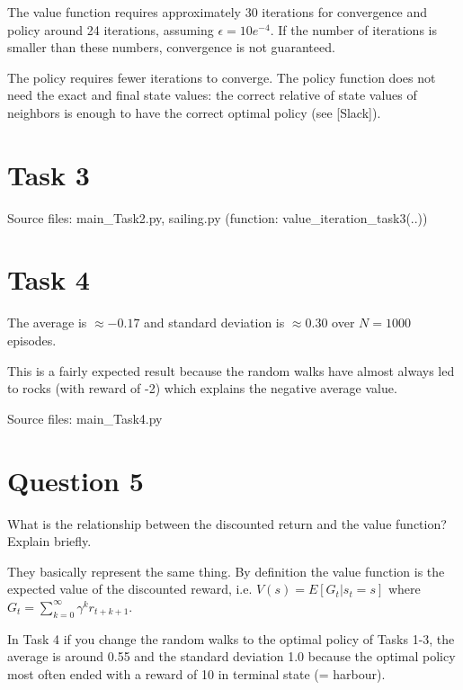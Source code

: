 \documentclass[12pt]{article}
\begin{document}
The value function requires approximately 30 iterations for convergence and policy around 24 iterations, assuming $\epsilon = 10e^{-4}$. If the number of iterations is smaller than these numbers, convergence is not guaranteed.
\newline

The policy requires fewer iterations to converge. The policy function does not need the exact and final state values: the correct relative of state values of neighbors is enough to have the correct optimal policy (see [Slack]).

\section*{Task 3}

\noindent
Source files: main\_Task2.py, sailing.py (function: value\_iteration\_task3(..))

\section*{Task 4}

The average is $\approx -0.17$ and standard deviation is $\approx 0.30$ over $N = 1000$ episodes. 
\newline

This is a fairly expected result because the random walks have almost always led to rocks (with reward of -2) which explains the negative average value.
\newline

\noindent
Source files: main\_Task4.py

\section*{Question 5}

What is the relationship between the discounted return and the value function?  
Explain briefly.
\newline

They basically represent the same thing. By definition the value function is the expected value of the discounted reward, i.e. $V(s) = E[G_t|s_t=s]$ where $G_t=\sum_{k=0}^{\infty} \gamma^k r_{t+k+1}$.
\newline

In Task 4 if you change the random walks to the optimal policy of Tasks 1-3, the average is around  0.55 and the standard deviation 1.0 because the optimal policy most often ended with a reward of 10 in terminal state (= harbour).   
\end{document}
